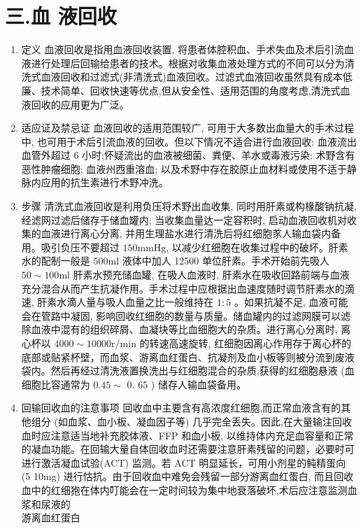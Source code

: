 \documentclass[10pt]{article}
\begin{document}
\section*{三.血 液回收}
\begin{enumerate}
  \item 定义 血液回收是指用血液回收装置, 将患者体腔积血、手术失血及术后引流血液进行处理后回输给患者的技术。根据对收集血液处理方式的不同可以分为清洗式血液回收和过滤式(非清洗式)血液回收。过滤式血液回收虽然具有成本低廉、技术简单、回收快速等优点,但从安全性、适用范围的角度考虑,清洗式血液回收的应用更为广泛。

  \item 适应证及禁忌证 血液回收的适用范围较广, 可用于大多数出血量大的手术过程中, 也可用于术后引流血液的回收。但以下情况不适合进行血液回收: 血液流出血管外超过 6 小时;怀疑流出的血液被细菌、粪便、羊水或毒液污染; 术野含有恶性肿瘤细胞; 血液州西重溶血; 以及术野中存在胶原止血材料或使用不适于静脉内应用的抗生素进行术野冲洗。

  \item 步骤 清洗式血液回收是利用负压将术野出血收集, 同时用肝素或构椽酸钠抗凝,经滤网过滤后储存于储血罐内; 当收集血量达一定容积时, 启动血液回收机对收集的血液进行离心分离, 并用生理盐水进行清洗后将红细胞㒸人输血袋内备用。吸引负压不要超过 $150 \mathrm{mmHg}$, 以减少红细胞在收集过程中的破坏。肝素水的配制一般是 $500 \mathrm{ml}$ 液体中加人 12500 单位肝素。手术开始前先吸人 $50 \sim 100 \mathrm{ml}$ 肝素水预充储血罐, 在吸人血液时, 肝素水在吸收回路前端与血液充分混合从而产生抗凝作用。手术过程中应根据出血速度随时调节肝素水的滴速, 肝素水滴人量与吸人血量之比一般维持在 $1: 5$ 。如果抗凝不足, 血液可能会在管路中凝固, 影响回收红细胞的数量与质量。储血罐内的过滤网膜可以滤除血液中混有的组织碎屑、血凝块等比血细胞大的杂质。进行离心分离时, 离心杯以 $4000 \sim 10000 \mathrm{r} / \mathrm{min}$ 的转速高速旋转, 红细胞因离心作用存于离心杯的底部或贴紧杯壁，而血浆、游离血红蛋白、抗凝剂及血小板等则被分流到废液袋内。然后再经过清洗液置换洗出与红细胞混合的杂质,获得的红细胞悬液 (血细胞比容通常为 $0.45 \sim$ 0. 65 ) 储存人输血袋备用。

  \item 回输回收血的注意事项 回收血中主要含有高浓度红细胞,而正常血液含有的其他组分 (如血浆、血小板、凝血因子等) 几乎完全丢失。因此,在大量输注回收血时应注意适当地补充胶体液、FFP 和血小板, 以维持体内充足血容量和正常的凝血功能。在回输大量自体回收血时还需要注意肝素残留的问题，必要时可进行激活凝血试验(ACT) 监测。若 ACT 明显延长，可用小剂星的鲀精蛋向 (5 10mg) 进行怙抗。由于回收血中难免会残留一部分游离血红蛋白, 而且回收血中的红细狍在体内叮能会在一定时间较为集中地衰落破坏,术后应注意监测血浆和尿液的\\
游离血红蛋白

\end{enumerate}
\end{document}
